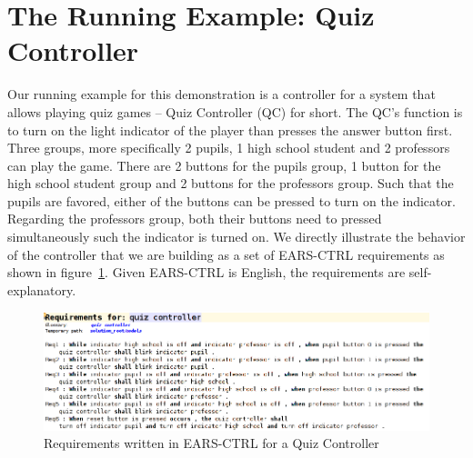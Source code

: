 \vspace{-.5cm}
\section{The Running Example: Quiz Controller}
\label{sec:example}
\vspace{-.3cm}
Our running example for this demonstration is a controller for a system that
allows playing quiz games -- Quiz Controller (QC) for short. The QC's
function is to turn on the light indicator of the player than presses the answer
button first. Three groups, more specifically 2 pupils, 1 high school student
and 2 professors can play the game. There are 2 buttons for the pupils group, 1
button for the high school student group and 2 buttons for the professors
group. Such that the pupils are favored, either of the buttons can be pressed to turn on the
indicator. Regarding the professors group, both their buttons need to pressed
simultaneously such the indicator is turned on. We directly illustrate the
behavior of the controller that we are building as a set of \textsf{EARS-CTRL} requirements as shown in figure~\ref{fig:QC_reqs}.
Given \textsf{EARS-CTRL} is English, the requirements are self-explanatory.
\begin{figure}[!h]
\centering
\includegraphics[width=1\textwidth]{./images/QC_Reqs.png}
\caption{Requirements written in \textsf{EARS-CTRL} for a Quiz Controller}
\label{fig:QC_reqs}
\end{figure}
